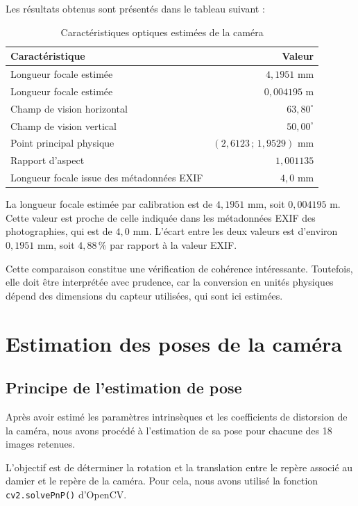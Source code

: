 \documentclass[12pt,a4paper]{report}
\begin{document}
Les résultats obtenus sont présentés dans le tableau suivant :

\begin{table}[H]
\centering
\caption{Caractéristiques optiques estimées de la caméra}
\label{tab:focale}
\begin{tabular}{lr}
\toprule
\textbf{Caractéristique} & \textbf{Valeur} \\
\midrule
Longueur focale estimée & $4{,}1951$ mm \\
Longueur focale estimée & $0{,}004195$ m \\
Champ de vision horizontal & $63{,}80^\circ$ \\
Champ de vision vertical & $50{,}00^\circ$ \\
Point principal physique & $(2{,}6123\,;\,1{,}9529)$ mm \\
Rapport d'aspect & $1{,}001135$ \\
\midrule
Longueur focale issue des métadonnées EXIF & $4{,}0$ mm \\
\bottomrule
\end{tabular}
\end{table}

La longueur focale estimée par calibration est de $4{,}1951$ mm, soit
$0{,}004195$ m. Cette valeur est proche de celle indiquée dans les métadonnées
EXIF des photographies, qui est de $4{,}0$ mm. L'écart entre les deux valeurs
est d'environ $0{,}1951$ mm, soit $4{,}88\,\%$ par rapport à la valeur EXIF.

Cette comparaison constitue une vérification de cohérence intéressante.
Toutefois, elle doit être interprétée avec prudence, car la conversion en
unités physiques dépend des dimensions du capteur utilisées, qui sont ici
estimées.


\chapter{Estimation des poses de la caméra}

\section{Principe de l'estimation de pose}

Après avoir estimé les paramètres intrinsèques et les coefficients de
distorsion de la caméra, nous avons procédé à l'estimation de sa pose
pour chacune des 18 images retenues.

L'objectif est de déterminer la rotation et la translation entre le
repère associé au damier et le repère de la caméra. Pour cela, nous
avons utilisé la fonction \texttt{cv2.solvePnP()} d'OpenCV.
\end{document}
